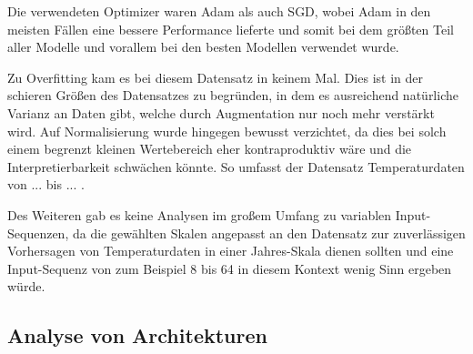 \documentclass[manuscript,screen,review]{acmart}
\begin{document}
Die verwendeten Optimizer waren Adam als auch SGD, wobei Adam in den meisten Fällen eine bessere Performance lieferte und somit bei dem größten Teil aller Modelle und vorallem bei den besten Modellen verwendet wurde. 

Zu Overfitting kam es bei diesem Datensatz in keinem Mal. Dies ist in der schieren Größen des Datensatzes zu begründen, in dem es ausreichend natürliche Varianz an Daten gibt, welche durch Augmentation nur noch mehr verstärkt wird.
Auf Normalisierung wurde hingegen bewusst verzichtet, da dies bei solch einem begrenzt kleinen Wertebereich eher kontraproduktiv wäre und die Interpretierbarkeit schwächen könnte. So umfasst der Datensatz Temperaturdaten von  ... bis ... .

Des Weiteren gab es keine Analysen im großem Umfang zu variablen Input-Sequenzen, da die gewählten Skalen angepasst an den Datensatz zur zuverlässigen Vorhersagen von Temperaturdaten in einer Jahres-Skala dienen sollten und eine Input-Sequenz von zum Beispiel 8 bis 64 in diesem Kontext wenig Sinn ergeben würde.


\subsection{Analyse von Architekturen}
\end{document}
